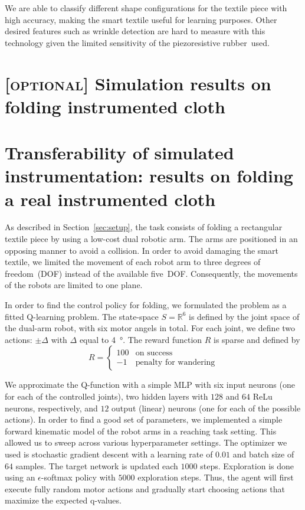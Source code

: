 \documentclass[\home/main.tex]{subfiles}
\begin{document}
We are able to classify different shape configurations for the textile piece with high accuracy, making the smart textile useful for learning purposes. Other desired features such as wrinkle detection are hard to measure with this technology given the limited sensitivity of the piezoresistive rubber~used.


\section{\textsc{[optional]} Simulation results on folding instrumented cloth}


\section{Transferability of simulated instrumentation: results on folding a real instrumented cloth}

As described in Section~\ref{sec:setup}, the task consists of folding a rectangular textile piece by using a low-cost dual robotic arm. The arms are positioned in an opposing manner to avoid a collision. In order to avoid damaging the smart textile, we limited the movement of each robot arm to three degrees of freedom~(DOF) instead of the available five~DOF. Consequently, the movements of the robots are limited to one plane.

In order to find the control policy for folding, we formulated the problem as a fitted Q-learning problem. The state-space $S=\mathbb{R}^6$ is defined by the joint space of the dual-arm robot, with six motor angels in total. For each joint, we define two actions: $\pm \Delta$ with $\Delta$ equal to \qty{4}{\degree}. The reward function $R$ is sparse and defined by
\begin{equation*}
R=
\begin{cases}
100 & \text{on success} \\
-1  & \text{penalty for wandering}
\end{cases}
\end{equation*}

We approximate the Q-function with a simple MLP with six input neurons (one for each of the controlled joints), two hidden layers with  $128$ and $64$ ReLu neurons, respectively, and $12$ output (linear) neurons (one for each of the possible actions). In order to find a good set of parameters, we implemented a simple forward kinematic model of the robot arms in a reaching task setting. This allowed us to sweep across various hyperparameter settings. The optimizer we used is stochastic gradient descent with a learning rate of $0.01$ and batch size of $64$ samples. The target network is updated each $1000$ steps. Exploration is done using an $\epsilon$-softmax policy with $5000$ exploration steps. Thus, the agent will first execute fully random motor actions and gradually start choosing actions that maximize the expected q-values.
\end{document}
